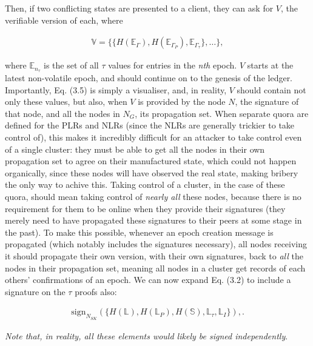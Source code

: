 \documentclass{extreport}
\begin{document}
Then, if two conflicting states are presented to a client, they can ask for \(V\), the verifiable version of each, where

\begin{align*}
\mathbb{V} = \{ \{ H(\mathbb{E}_\Gamma), H(\mathbb{E}_{\Gamma_P}), \mathbb{E}_{\Gamma_\tau} \}, \ldots \}, \tag{3.5}
\end{align*}

where \(\mathbb{E}_{n_\tau}\) is the set of all \(\tau\) values for entries in the \emph{nth} epoch. \(V\) starts at the latest non-volatile epoch, and should continue on to the genesis of the ledger. Importantly, Eq. (3.5) is simply a visualiser, and, in reality, \(V\) should contain not only these values, but also, when \(V\) is provided by the node \(N\), the signature of that node, and all the nodes in \(N_G\), its propagation set. When separate quora are defined for the PLRs and NLRs (since the NLRs are generally trickier to take control of), this makes it incredibly difficult for an attacker to take control even of a single cluster: they must be able to get all the nodes in their own propagation set to agree on their manufactured state, which could not happen organically, since these nodes will have observed the real state, making bribery the only way to achive this. Taking control of a cluster, in the case of these quora, should mean taking control of \emph{nearly all} these nodes, because there is no requirement for them to be online when they provide their signatures (they merely need to have propagated these signatures to their peers at some stage in the past). To make this possible, whenever an epoch creation message is propagated (which notably includes the signatures necessary), all nodes receiving it should propagate their own version, with their own signatures, back to \emph{all} the nodes in their propagation set, meaning all nodes in a cluster get records of each others' confirmations of an epoch. We can now expand Eq. (3.2) to include a signature on the \(\tau\) proofs also:

\begin{align*}
\mathrm{sign}_{N_{SK}}(\{ H(\mathbb{L}), H(\mathbb{L}_P), H(\mathbb{S}), \mathbb{L}_\tau, \mathbb{L}_I \}), \tag{3.6}.
\end{align*}

\emph{Note that, in reality, all these elements would likely be signed independently}.
\end{document}
